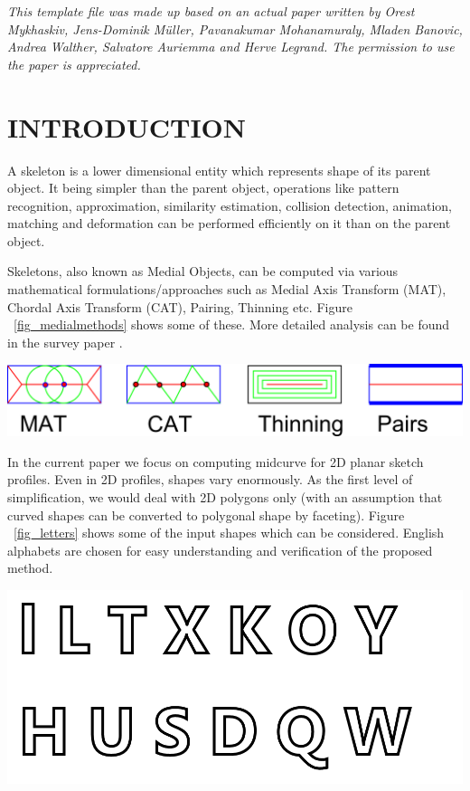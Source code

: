 \documentclass[9pt,academicons]{article}
\begin{document}



\noindent
\textit{This template file was made up based on an actual paper written by Orest Mykhaskiv, Jens-Dominik M\"uller, Pavanakumar Mohanamuraly, Mladen Banovic, Andrea Walther, Salvatore Auriemma and Herve Legrand. The permission to use the paper is appreciated.}


\section{INTRODUCTION}
A skeleton is a lower dimensional entity which represents shape of its parent object. It being simpler than the parent object, operations like pattern recognition, approximation, similarity estimation, collision detection, animation, matching and deformation can be performed efficiently on it than on the parent object. 

Skeletons, also known as Medial Objects, can be computed via various mathematical formulations/approaches such as Medial Axis Transform (MAT), Chordal Axis Transform (CAT), Pairing, Thinning etc. Figure ~\ref{fig_medialmethods} shows some of these. More detailed analysis can be found in the survey paper \cite{medial2010}.

    \begin{center}
	\includegraphics[width=0.6\linewidth]{images/MedialMethodsOnlyShort}
	\label{fig_medialmethods}
    \end{center}
    

In the current paper we focus on computing midcurve for 2D planar sketch profiles.  Even in 2D profiles, shapes vary enormously. As the first level of simplification, we would deal with 2D polygons only (with an assumption that curved shapes can be converted to polygonal shape by faceting). Figure ~\ref{fig_letters} shows some of the input shapes which can be considered. English alphabets are chosen for easy understanding and verification of the proposed method.

     \begin{center}
	\includegraphics[width=0.6\linewidth]{images/Letters}
	\label{fig_letters}
    \end{center}
\end{document}
